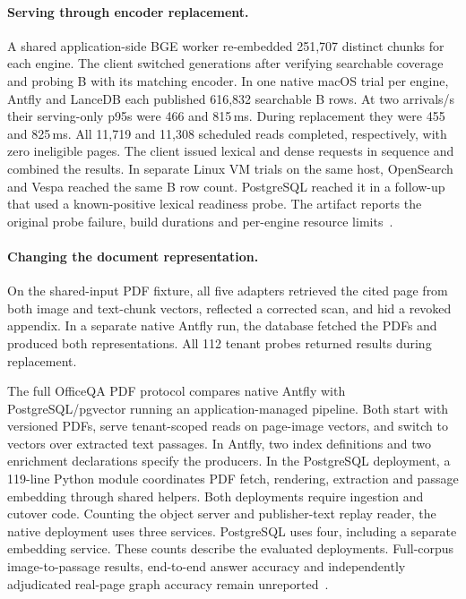 \documentclass[sigconf,nonacm]{acmart}
\begin{document}
\paragraph{Serving through encoder replacement.}
A shared application-side BGE worker re-embedded 251,707 distinct chunks
for each engine. The client switched generations after verifying searchable
coverage and probing B with its matching encoder. In one native macOS trial
per engine, Antfly and LanceDB each published 616,832 searchable B rows.
At two arrivals/s their serving-only p95s were 466 and 815\,ms. During
replacement they were 455 and 825\,ms. All 11,719 and 11,308 scheduled
reads completed, respectively, with zero ineligible pages. The client
issued lexical and dense requests in sequence and combined the results.
In separate Linux VM trials on the same host, OpenSearch and Vespa reached
the same B row count. PostgreSQL reached it in a follow-up that used a
known-positive lexical readiness probe. The artifact reports the original
probe failure, build durations and per-engine resource limits~\cite{antfly-paper-repo}.

\paragraph{Changing the document representation.} On the shared-input
PDF fixture, all five adapters retrieved the cited page from both image
and text-chunk vectors, reflected a corrected scan, and hid a revoked
appendix. In a separate native Antfly run, the database fetched the PDFs
and produced both representations. All 112 tenant probes returned results
during replacement.

The full OfficeQA PDF protocol compares native Antfly with PostgreSQL/pgvector
running an application-managed pipeline. Both start with versioned PDFs,
serve tenant-scoped reads on page-image vectors, and switch to vectors over
extracted text passages. In Antfly, two index definitions and two enrichment
declarations specify the producers. In the PostgreSQL deployment, a 119-line
Python module coordinates PDF fetch, rendering, extraction and passage
embedding through shared helpers. Both deployments require ingestion and
cutover code. Counting the object server and publisher-text replay reader,
the native deployment uses three services. PostgreSQL uses four, including
a separate embedding service. These counts describe the evaluated deployments.
Full-corpus image-to-passage results, end-to-end answer accuracy and
independently adjudicated real-page graph accuracy remain
unreported~\cite{antfly-paper-repo}.
\end{document}
